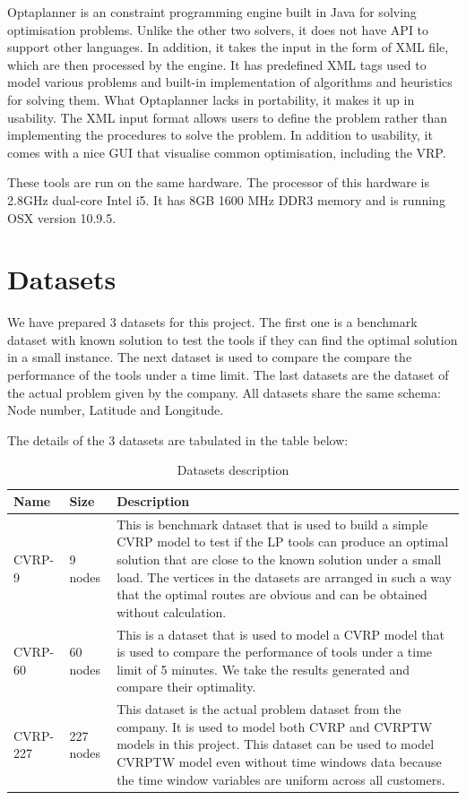 \documentclass[a4paper, 12pt]{report}
\begin{document}
Optaplanner is an constraint programming engine built in Java for solving optimisation problems. Unlike the other two solvers, it does not
have API to support other languages. In addition, it takes the input in the form of XML file, which are then processed by the engine. It has
predefined XML tags used to model various problems and built-in implementation of algorithms and heuristics for solving them. What Optaplanner
lacks in portability, it makes it up in usability. The XML input format allows users to define the problem rather than implementing the procedures
to solve the problem. In addition to usability, it comes with a nice GUI that visualise common optimisation, including the VRP.

These tools are run on the same hardware. The processor of this hardware is 2.8GHz dual-core Intel i5. It has
8GB 1600 MHz DDR3 memory and is running OSX version 10.9.5.

\section{Datasets}
We have prepared 3 datasets for this project. The first one is a benchmark dataset with known solution to test the tools
if they can find the optimal solution in a small instance. The next dataset is used to compare the compare the performance
of the tools under a time limit. The last datasets are the dataset of the actual problem given by the company. All datasets
share the same schema: Node number, Latitude and Longitude.

The details of the 3 datasets are tabulated in the table below:
\begin{table}[!ht]
    \begin{center}
        \begin{tabular}{ | l | l | p{10.5cm} |}
        \hline
        Name & Size  & Description \\ \hline
        CVRP-9 & 9 nodes  & This is benchmark dataset that is used to build a simple CVRP model to test
        if the LP tools can produce an optimal solution that are close to the known solution under a small load. The vertices in the datasets
        are arranged in such a way that the optimal routes are obvious and can be obtained without calculation.\\ \hline
        CVRP-60 & 60 nodes & This is a dataset that is used to model a CVRP model that is used to compare the performance of tools
        under a time limit of 5 minutes. We take the results generated and compare their optimality.\\ \hline
        CVRP-227 & 227 nodes & This dataset is the actual problem dataset from the company. It is used to model both CVRP and CVRPTW models
        in this project. This dataset can be used to model CVRPTW model even without time windows data because the time window variables are uniform across
        all customers. \\
        \hline
        \end{tabular}
        \caption{Datasets description}
        \label{table:dataset_description}
    \end{center}
\end{table}
\end{document}
